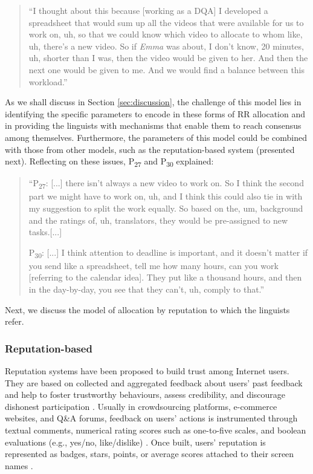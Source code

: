 \begin{quote}
    ``I thought about this because [working as a DQA] I developed a spreadsheet that would sum up all the videos that were available for us to work on, uh, so that we could know which video to allocate to whom like, uh, there's a new video. So if \textit{Emma} was about, I don't know, 20 minutes, uh, shorter than I was, then the video would be given to her. And then the next one would be given to me. And we would find a balance between this workload.''
\end{quote}

As we shall discuss in Section \ref{sec:discussion}, the challenge of this model lies in identifying the specific parameters to encode in these forms of RR allocation and in providing the linguists with mechanisms that enable them to reach consensus among themselves. Furthermore, the parameters of this model could be combined with those from other models, such as the reputation-based system (presented next). Reflecting on these issues, P\textsubscript{27} and P\textsubscript{30} explained:

\begin{quote}
    ``P\textsubscript{27}: [...] there isn’t always a new video to work on. So I think the second part we might have to work on, uh, and I think this could also tie in with my suggestion to split the work equally. So based on the, um, background and the ratings of, uh, translators, they would be pre-assigned to new tasks.[...]  
    
    P\textsubscript{30}: [...] I think attention to deadline is important, and it doesn't matter if you send like a spreadsheet, tell me how many hours, can you work [referring to the calendar idea]. They put like a thousand hours, and then in the day-by-day, you see that they can't, uh, comply to that.''
\end{quote}

Next, we discuss the model of allocation by reputation to which the linguists refer.

\subsubsection{Reputation-based}
\label{subsec:reputation-model}
Reputation systems have been proposed to build trust among Internet users. They are based on collected and aggregated feedback about users' past feedback and help to foster trustworthy behaviours, assess credibility, and discourage dishonest participation \cite{resnick2000reputation}. Usually in crowdsourcing platforms, e-commerce websites, and Q\&A forums, feedback on users' actions is instrumented through textual comments, numerical rating scores such as one-to-five scales, and boolean evaluations (e.g., yes/no, like/dislike) \cite{resnick2006value}. Once built, users' reputation is represented as badges, stars, points, or average scores attached to their screen names \cite{papoutsoglou2020modeling, willems2019reputation, kraut2012building}. 

